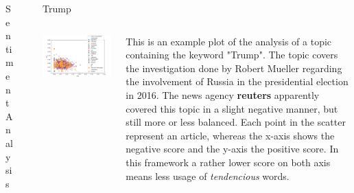 \documentclass[final]{beamer}
\newlength{\sepwid}
\newlength{\onecolwid}
\newlength{\twocolwid}
\begin{document}
\begin{frame}[t]
\begin{columns}[t]
\begin{column}{\onecolwid}
\begin{block}{Sentiment Analysis}
    \end{block}

\end{column} %


\begin{column}{\sepwid}\end{column} %

\begin{column}{\twocolwid} %


\begin{block}{Trump}

\begin{columns}[onlytextwidth]
    \begin{column}{.4\textwidth}
        \includegraphics[width=0.8\linewidth]{poster/trump_11_reuters.png} 
    \end{column}
    \begin{column}{.6\textwidth}
        This is an example plot of the analysis of a topic containing the keyword "Trump". The topic covers the investigation done by Robert Mueller regarding the involvement of Russia in the presidential election in 2016. The news agency \textbf{reuters} apparently covered this topic in a slight negative manner, but still more or less balanced. Each point in the scatter represent an article, whereas the x-axis shows the negative score and the y-axis the positive score. In this framework a rather lower score on both axis means less usage of \textit{tendencious} words.
    \end{column}
\end{columns}

\end{block}


\end{column}
\end{columns}
\end{frame}
\end{document}
